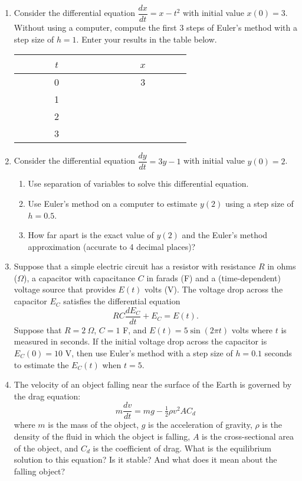 \documentclass[10pt]{article}
\begin{document}
\begin{enumerate}
\setcounter{enumi}{\theenumCount}
\item Consider the differential equation $\dfrac{dx}{dt} = x - t^2$ with initial value $x(0) = 3$.  Without using a computer, compute the first 3 steps of Euler's method with a step size of $h = 1$.  Enter your results in the table below. 

\renewcommand{\arraystretch}{1.5}
\begin{tabular}{|c|c|}
\hline
~~~~~~ $t$ ~~~~~~ & ~~~~~~ $x$ ~~~~~~ \\ \hline
0 & 3 \\ \hline
1 &   \\ \hline
2 &   \\ \hline
3 &   \\ \hline
\end{tabular}

\bigskip
\bigskip


\item Consider the differential equation $\dfrac{dy}{dt} = 3y - 1$ with initial value $y(0) = 2$.  
\begin{enumerate}
\item Use separation of variables to solve this differential equation.
\vfill


\item Use Euler's method on a computer to estimate $y(2)$ using a step size of $h = 0.5$.  
\bigskip
\bigskip


\item How far apart is the exact value of $y(2)$ and the Euler's method approximation (accurate to 4 decimal places)?
\vspace*{1.0in}
\end{enumerate}


\newpage
\item Suppose that a simple electric circuit has a resistor with resistance $R$ in ohms ($\Omega$), a capacitor with capacitance $C$ in farads (F) and a (time-dependent) voltage source that provides $E(t)$ volts (V).  The voltage drop across the capacitor $E_C$ satisfies the differential equation
$$RC \dfrac{dE_C}{dt} + E_C = E(t).$$
Suppose that  $R = 2~\Omega$, $C = 1$ F, and $E(t) = 5 \sin (2 \pi t)$ volts where $t$ is measured in seconds. If the initial voltage drop across the capacitor is $E_C(0) = 10$ V, then use Euler's method with a step size of $h = 0.1$ seconds to estimate the $E_C(t)$ when $t = 5$.  
\vfill

\item The velocity of an object falling near the surface of the Earth is governed by the drag equation:
$$m \dfrac{dv}{dt} = mg - \tfrac{1}{2} \rho v^2 A C_d$$
where $m$ is the mass of the object, $g$ is the acceleration of gravity, $\rho$ is the density of the fluid in which the object is falling, $A$ is the cross-sectional area of the object, and $C_d$ is the coefficient of drag.  What is the equilibrium solution to this equation? Is it stable?  And what does it mean about the falling object?  
\vfill



\end{enumerate}
\end{document}
